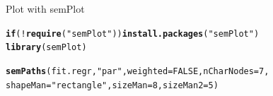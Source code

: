 \documentclass[10pt]{beamer}\usepackage[]{graphicx}\usepackage[]{xcolor}
\makeatletter
\newcommand{\hlnum}[1]{\textcolor[rgb]{0.686,0.059,0.569}{#1}}%
\newcommand{\hlstr}[1]{\textcolor[rgb]{0.192,0.494,0.8}{#1}}%
\newcommand{\hlopt}[1]{\textcolor[rgb]{0,0,0}{#1}}%
\newcommand{\hlstd}[1]{\textcolor[rgb]{0.345,0.345,0.345}{#1}}%
\newcommand{\hlkwa}[1]{\textcolor[rgb]{0.161,0.373,0.58}{\textbf{#1}}}%
\newcommand{\hlkwc}[1]{\textcolor[rgb]{0.333,0.667,0.333}{#1}}%
\newcommand{\hlkwd}[1]{\textcolor[rgb]{0.737,0.353,0.396}{\textbf{#1}}}%
\newenvironment{kframe}{%
 \def\at@end@of@kframe{}%
 \ifinner\ifhmode%
  \def\at@end@of@kframe{\end{minipage}}%
  \begin{minipage}{\columnwidth}%
 \fi\fi%
 \def\FrameCommand##1{\hskip\@totalleftmargin \hskip-\fboxsep
 \colorbox{shadecolor}{##1}\hskip-\fboxsep
     \hskip-\linewidth \hskip-\@totalleftmargin \hskip\columnwidth}%
 \MakeFramed {\advance\hsize-\width
   \@totalleftmargin\z@ \linewidth\hsize
   \@setminipage}}%
 {\par\unskip\endMakeFramed%
 \at@end@of@kframe}
\newenvironment{knitrout}{}{} %
\makeatother
\begin{document}
%
\begin{frame}[fragile]{Plot with semPlot}

\begin{knitrout}
\color{fgcolor}\begin{kframe}
\begin{alltt}
\hlkwa{if} \hlstd{(}\hlopt{!}\hlkwd{require}\hlstd{(}\hlstr{"semPlot"}\hlstd{))} \hlkwd{install.packages}\hlstd{(}\hlstr{"semPlot"}\hlstd{)}
\hlkwd{library}\hlstd{(semPlot)}
\end{alltt}
\end{kframe}
\end{knitrout}
\begin{knitrout}
\color{fgcolor}\begin{kframe}
\begin{alltt}
\hlkwd{semPaths}\hlstd{(fit.regr,} \hlstr{"par"}\hlstd{,} \hlkwc{weighted} \hlstd{=} \hlnum{FALSE}\hlstd{,} \hlkwc{nCharNodes} \hlstd{=} \hlnum{7}\hlstd{,}
         \hlkwc{shapeMan} \hlstd{=} \hlstr{"rectangle"}\hlstd{,} \hlkwc{sizeMan} \hlstd{=} \hlnum{8}\hlstd{,} \hlkwc{sizeMan2} \hlstd{=} \hlnum{5}\hlstd{)}
\end{alltt}
\end{kframe}
\end{knitrout}
\end{frame}
%
\end{document}
